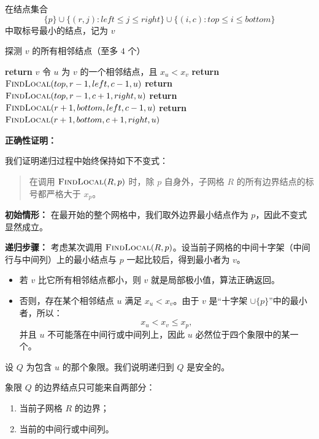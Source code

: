 ﻿\documentclass[12pt,a4paper]{article}
\begin{document}
\begin{answerbox}
\begin{algorithm}[H]
\begin{algorithmic}[1]
\STATE 在结点集合
\[
\{p\}\cup \{(r,j): left\le j\le right\}\cup \{(i,c): top\le i\le bottom\}
\]
中取标号最小的结点，记为 $v$

\STATE 探测 $v$ 的所有相邻结点（至多 $4$ 个）

    \STATE \textbf{return} $v$
\ELSE
    \STATE 令 $u$ 为 $v$ 的一个相邻结点，且 $x_u < x_v$
        \STATE \textbf{return} $\textsc{FindLocal}(top,r-1,left,c-1,u)$
        \STATE \textbf{return} $\textsc{FindLocal}(top,r-1,c+1,right,u)$
        \STATE \textbf{return} $\textsc{FindLocal}(r+1,bottom,left,c-1,u)$
    \ELSE
        \STATE \textbf{return} $\textsc{FindLocal}(r+1,bottom,c+1,right,u)$
    \ENDIF
\ENDIF
\end{algorithmic}
\end{algorithm}

\medskip
\textbf{正确性证明：}

我们证明递归过程中始终保持如下不变式：

\begin{quote}
在调用 $\textsc{FindLocal}(R,p)$ 时，除 $p$ 自身外，子网格 $R$ 的所有边界结点的标号都严格大于 $x_p$。
\end{quote}

\textbf{初始情形：}
在最开始的整个网格中，我们取外边界最小结点作为 $p$，因此不变式显然成立。

\textbf{递归步骤：}
考虑某次调用 $\textsc{FindLocal}(R,p)$。设当前子网格的中间十字架（中间行与中间列）上的最小结点与 $p$ 一起比较后，得到最小者为 $v$。

\begin{itemize}
    \item 若 $v$ 比它所有相邻结点都小，则 $v$ 就是局部极小值，算法正确返回。
    
    \item 否则，存在某个相邻结点 $u$ 满足 $x_u < x_v$。由于 $v$ 是“十字架 $\cup \{p\}$”中的最小者，所以：
    \[
    x_u < x_v \le x_p,
    \]
    并且 $u$ 不可能落在中间行或中间列上，因此 $u$ 必然位于四个象限中的某一个。
\end{itemize}

设 $Q$ 为包含 $u$ 的那个象限。我们说明递归到 $Q$ 是安全的。

象限 $Q$ 的边界结点只可能来自两部分：

\begin{enumerate}
    \item 当前子网格 $R$ 的边界；
    \item 当前的中间行或中间列。
\end{enumerate}


\end{answerbox}
\end{document}
